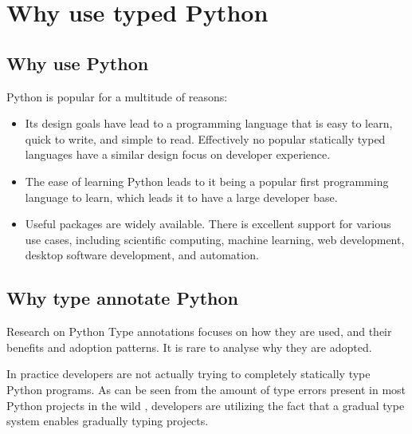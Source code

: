 \chapter{Why use typed Python\label{discussion}}  

\section{Why use Python}
Python is popular for a multitude of reasons:

\begin{itemize}
    \item Its design goals have lead to a programming language that is easy to learn, quick to write, and simple to read. Effectively no popular statically typed languages have a similar design focus on developer experience.
    \item The ease of learning Python leads to it being a popular first programming language to learn, which leads it to have a large developer base.
    \item Useful packages are widely available. There is excellent support for various use cases, including scientific computing, machine learning, web development, desktop software development, and automation. 
\end{itemize}

\section{Why type annotate Python}

Research on Python Type annotations focuses on how they are used, and their benefits and adoption patterns. It is rare to analyse why they are adopted.

In practice developers are not actually trying to completely statically type Python programs. As can be seen from the amount of type errors present in most Python projects in the wild \cite{di_grazia_evolution_2022, rak-amnouykit_taleoftwo_2020,}, developers are utilizing the fact that a gradual type system enables gradually typing projects.

